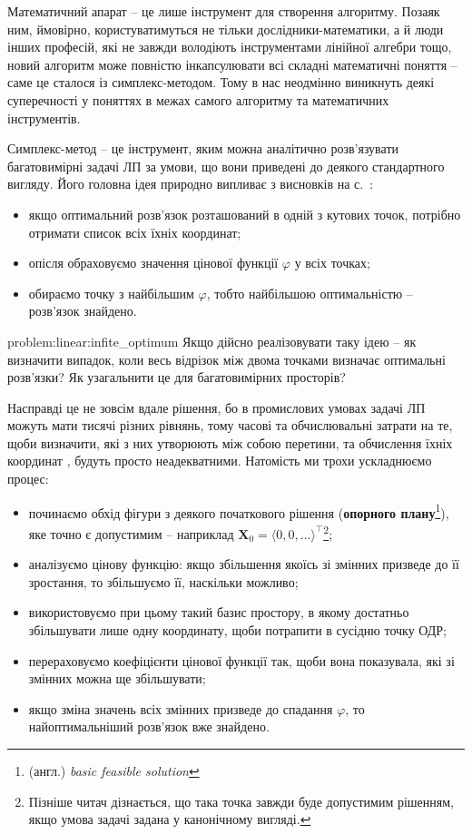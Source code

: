 \documentclass[\main/book.tex]{subfiles}
\begin{document}
\begin{note}
 Математичний апарат -- це лише інструмент для створення алгоритму. Позаяк ним, ймовірно, користуватимуться не тільки дослідники-математики, а й люди інших професій, які не завжди володіють інструментами лінійної алгебри тощо, новий алгоритм може повністю інкапсулювати всі складні математичні поняття -- саме це сталося із симплекс-методом. Тому в нас неодмінно виникнуть деякі суперечності у поняттях в межах самого алгоритму та математичних інструментів.
\end{note}

Симплекс-метод -- це інструмент, яким можна аналітично розв'язувати багатовимірні задачі ЛП за умови, що вони приведені до деякого стандартного вигляду. Його головна ідея природно випливає з висновків на с.~\pageref{conclusions:linear:solving}:

\begin{itemize}
 \item якщо оптимальний розв'язок розташований в одній з кутових точок, потрібно отримати список всіх їхніх координат;
 \item опісля обраховуємо значення цінової функції $\varphi$ у всіх точках;
 \item обираємо точку з найбільшим $\varphi$, тобто найбільшою оптимальністю -- розв'язок знайдено.
\end{itemize}

\begin{problem}{problem:linear:infite_optimum}
 Якщо дійсно реалізовувати таку ідею -- як визначити випадок, коли весь відрізок між двома точками визначає оптимальні розв'язки? Як узагальнити це для багатовимірних просторів?
\end{problem}

Насправді це не зовсім вдале рішення, бо в промислових умовах задачі ЛП можуть мати тисячі різних рівнянь, тому часові та обчислювальні затрати на те, щоби визначити, які з них утворюють між собою перетини, та обчислення їхніх координат
, будуть просто неадекватними. Натомість ми трохи ускладнюємо процес:

\begin{itemize}
 \item починаємо обхід фігури з деякого початкового рішення (\textbf{опорного плану}\footnote{(англ.) \textit{basic feasible solution}}), яке точно є допустимим -- наприклад $\mathbf{X}_0 = {\langle 0, 0, \ldots \rangle^\top}$\footnote{Пізніше читач дізнається, що така точка завжди буде допустимим рішенням, якщо умова задачі задана у канонічному вигляді.};
 \item аналізуємо цінову функцію: якщо збільшення якоїсь зі змінних призведе до її зростання, то збільшуємо її, наскільки можливо;
 \item використовуємо при цьому такий базис простору, в якому достатньо збільшувати лише одну координату, щоби потрапити в сусідню точку ОДР;
 \item перераховуємо коефіцієнти цінової функції так, щоби вона показувала, які зі змінних можна ще збільшувати;
 \item якщо зміна значень всіх змінних призведе до спадання $\varphi$, то найоптимальніший розв'язок вже знайдено.
\end{itemize}
\end{document}
